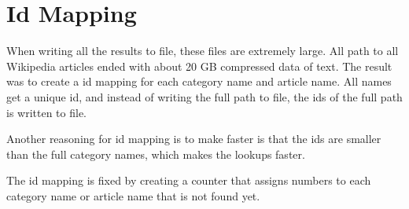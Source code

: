 \section{Id Mapping}
When writing all the results to file, these files are extremely large. All path to all Wikipedia articles ended with about 20 GB compressed data of text. The result was to create a id mapping for each category name and article name. All names get a unique id, and instead of writing the full path to file, the ids of the full path is written to file. 


Another reasoning for id mapping is to make faster is that the ids are smaller than the full category names, which makes the lookups faster. 





The id mapping is fixed by creating a counter that assigns numbers to each category name or article name that is not found yet.  